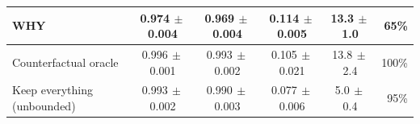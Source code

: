\begin{table}[t]
\begin{tabular}{@{}lccccr@{}}
\textbf{WHY} & \textbf{0.974{\scriptsize$\,\pm$0.004}} & \textbf{0.969{\scriptsize$\,\pm$0.004}} & 0.114{\scriptsize$\,\pm$0.005} & 13.3{\scriptsize$\,\pm$1.0} & 65\%\\
\midrule
Counterfactual oracle & 0.996{\scriptsize$\,\pm$0.001} & 0.993{\scriptsize$\,\pm$0.002} & 0.105{\scriptsize$\,\pm$0.021} & 13.8{\scriptsize$\,\pm$2.4} & 100\%\\
Keep everything (unbounded) & 0.993{\scriptsize$\,\pm$0.002} & 0.990{\scriptsize$\,\pm$0.003} & 0.077{\scriptsize$\,\pm$0.006} & 5.0{\scriptsize$\,\pm$0.4} & 95\%\\
\bottomrule
\end{tabular}
\end{table}

